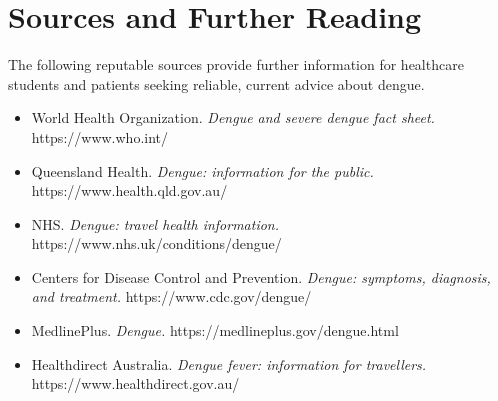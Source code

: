 \section*{Sources and Further Reading}
The following reputable sources provide further information for healthcare students and patients seeking reliable, current advice about dengue.

\begin{itemize}
    \item World Health Organization. \textit{Dengue and severe dengue fact sheet.} https://www.who.int/
    \item Queensland Health. \textit{Dengue: information for the public.} https://www.health.qld.gov.au/
    \item NHS. \textit{Dengue: travel health information.} https://www.nhs.uk/conditions/dengue/
    \item Centers for Disease Control and Prevention. \textit{Dengue: symptoms, diagnosis, and treatment.} https://www.cdc.gov/dengue/
    \item MedlinePlus. \textit{Dengue.} https://medlineplus.gov/dengue.html
    \item Healthdirect Australia. \textit{Dengue fever: information for travellers.} https://www.healthdirect.gov.au/
\end{itemize}

